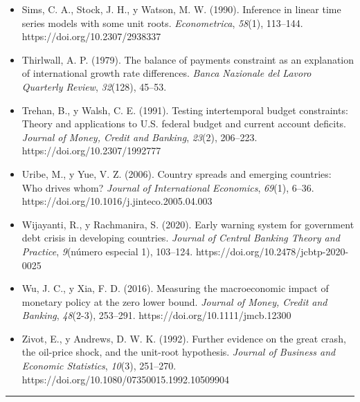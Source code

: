 \begin{itemize}[label={},leftmargin=1.27cm,itemindent=-1.27cm,itemsep=0.6\baselineskip]
\item
  Sims, C. A., Stock, J. H., y Watson, M. W. (1990). Inference in linear
  time series models with some unit roots. \emph{Econometrica},
  \emph{58}(1), 113--144. https://doi.org/10.2307/2938337
\item
  Thirlwall, A. P. (1979). The balance of payments constraint as an
  explanation of international growth rate differences. \emph{Banca
  Nazionale del Lavoro Quarterly Review}, \emph{32}(128), 45--53.
\item
  Trehan, B., y Walsh, C. E. (1991). Testing intertemporal budget
  constraints: Theory and applications to U.S. federal budget and
  current account deficits. \emph{Journal of Money, Credit and Banking},
  \emph{23}(2), 206--223. https://doi.org/10.2307/1992777
\item
  Uribe, M., y Yue, V. Z. (2006). Country spreads and emerging
  countries: Who drives whom? \emph{Journal of International Economics},
  \emph{69}(1), 6--36. https://doi.org/10.1016/j.jinteco.2005.04.003
\item
  Wijayanti, R., y Rachmanira, S. (2020). Early warning system for
  government debt crisis in developing countries. \emph{Journal of
  Central Banking Theory and Practice}, \emph{9}(número especial 1),
  103--124. https://doi.org/10.2478/jcbtp-2020-0025
\item
  Wu, J. C., y Xia, F. D. (2016). Measuring the macroeconomic impact of
  monetary policy at the zero lower bound. \emph{Journal of Money,
  Credit and Banking}, \emph{48}(2-3), 253--291.
  https://doi.org/10.1111/jmcb.12300
\item
  Zivot, E., y Andrews, D. W. K. (1992). Further evidence on the great
  crash, the oil-price shock, and the unit-root hypothesis.
  \emph{Journal of Business and Economic Statistics}, \emph{10}(3),
  251--270. https://doi.org/10.1080/07350015.1992.10509904
\end{itemize}

\begin{center}\rule{0.5\linewidth}{0.5pt}\end{center}
